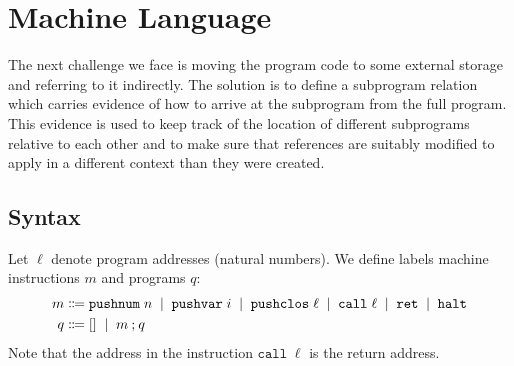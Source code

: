 \documentclass[12pt]{article}
\newcommand{\alt}{\;\; | \;\;}
\newcommand{\defi}{\Coloneqq}
\newcommand{\nil}{[]}
\newcommand{\h}[1]{\hat{#1}}
\newcommand{\sg}{\sigma}
\renewcommand{\P}{\mathcal{P}}
\newcommand{\mpushnum}[1]{\mathtt{pushnum} \; #1}
\newcommand{\mhalt}{\mathtt{halt}}
\newcommand{\mpushvar}[1]{\mathtt{pushvar} \; #1}
\newcommand{\mpushclos}[1]{\mathtt{pushclos} \; #1}
\newcommand{\mcall}[1]{\mathtt{call} \; #1}
\newcommand{\mret}{\mathtt{ret}}
\newcommand{\tracc}[3]{\ensuremath{#1 \circ #2 \rhd #3}}
\newcommand{\hev}[3]{\ensuremath{#1 \vdash #2 \Downarrow #3}}
\newcommand{\ssev}[4]{\ensuremath{\langle #1; #2 \rangle \rightarrow^* \langle #3; #4 \rangle}}
\newcommand{\fr}[2]{\langle #1; #2 \rangle}
\newcommand{\cor}[2]{\ensuremath{#1 \rightsquigarrow #2}}
\newcommand{\e}{e} %
\renewcommand{\b}{b} %
\renewcommand{\v}{v} %
\newcommand{\s}{s}
\renewcommand{\ss}{p} %
\newcommand{\w}{w}
\renewcommand{\h}{h}
\renewcommand{\l}{\ell}
\renewcommand{\b}{\beta}
\newcounter{statementcounter}
\newtheorem{lemma}[statementcounter]{Lemma}
\begin{document}



\section*{Machine Language}
The next challenge we face is moving the program code to some external storage and referring to it indirectly.
The solution is to define a subprogram relation which carries evidence of how to arrive at the subprogram from the full program.
This evidence is used to keep track of the location of different subprograms relative to each other and to make sure that references are suitably modified to apply in a different context than they were created.


\subsection*{Syntax}

\renewcommand{\mpushnum}[1]{\mathtt{pushnum} \; #1}%
\renewcommand{\mpushvar}[1]{\mathtt{pushvar} \; #1}%
\renewcommand{\mpushclos}[1]{\mathtt{pushclos} \; #1}%
\renewcommand{\mcall}[1]{\mathtt{call} \; #1}%
\renewcommand{\mret}{\mathtt{ret}}%
\renewcommand{\mhalt}{\mathtt{halt}}%

Let $\l$ denote program addresses (natural numbers).
We define labels machine instructions $m$ and programs $q$:
\begin{align*}
  m &\defi \mpushnum{n} \alt \mpushvar{i} \alt \mpushclos{\l} \alt \mcall{\l} \alt \mret \alt \mhalt \\
  q &\defi \nil \alt m \seq q
\end{align*}
Note that the address in the instruction $\mcall{\l}$ is the return address.
\end{document}
